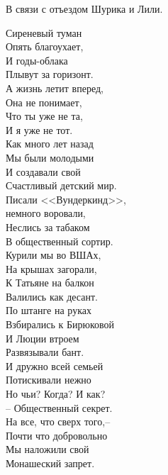 {\raggedleft В связи с отъездом Шурика и Лили.

}

\begin{multicols}{2}

\itshape
    
    \noindent
    Сиреневый туман \\
    Опять благоухает, \\
    И годы-облака \\
    Плывут за горизонт. \\
    \vfill
    \columnbreak
    \noindent
    А жизнь летит вперед,\\
    Она не понимает,\\
    Что ты уже не та,\\
    И я уже не тот. \\
    \vfill
    \columnbreak
    \noindent
    Как много лет назад\\
    Мы были молодыми\\
    И создавали свой\\
    Счастливый детский мир.\\
    \vfill
    \noindent
    Писали <<Вундеркинд>>,\\
    немного воровали,\\
    Неслись за табаком\\
    В общественный сортир.\\
    \vfill
    \noindent
    Курили мы во ВШАх,\\
    На крышах загорали,\\
    К Татьяне на балкон\\
    Валились как десант.\\
    \vfill   
    \noindent 
    По штанге на руках\\
    Взбирались к Бирюковой\\
    И Люции втроем\\
    Развязывали бант.\\
    \vfill
    \noindent
    И дружно всей семьей\\
    Потискивали нежно\\
    Но чьи? Когда? И как?\\
    -- Общественный секрет.\\
    \vfill
    \noindent
    На все, что сверх того,--\\
    Почти что добровольно\\
    Мы наложили свой \\
    Монашеский запрет.\\

\end{multicols}
